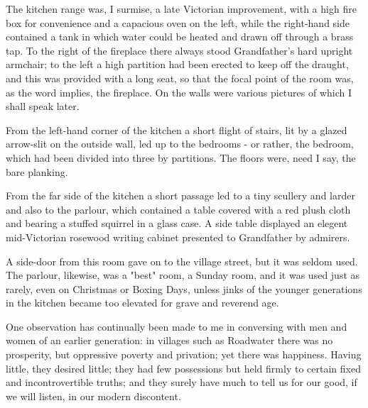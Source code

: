 The kitchen range was, I surmise, a late Victorian improvement, with a high fire box for convenience and a capacious oven on the left, while the right-hand side contained a tank in which water could be heated and drawn off through a brass tap. To the right of the fireplace there always stood Grandfather's hard upright armchair; to the left a high partition had been erected to keep off the draught, and this was provided with a long seat, so that the focal point of the room was, as the word implies, the fireplace. On the walls were various pictures of which I shall speak later.

From the left-hand corner of the kitchen a short flight of stairs, lit by a glazed arrow-slit on the outside wall, led up to the bedrooms - or rather, the bedroom, which had been divided into three by partitions. The floors were, need I say, the bare planking.

From the far side of the kitchen a short passage led to a tiny scullery and larder and also to the parlour, which contained a table covered with a red plush cloth and bearing a stuffed squirrel in a glass case. A side table displayed an elegent mid-Victorian rosewood writing cabinet presented to Grandfather by admirers.

A side-door from this room gave on to the village street, but it was seldom used. The parlour, likewise, was a "best" room, a Sunday room, and it was used just as rarely, even on Christmas or Boxing Days, unless jinks of the younger generations in the kitchen became too elevated for grave and reverend age.

\Flourish

One observation has continually been made to me in conversing with men and women of an earlier generation: in villages such as Roadwater there was no prosperity, but oppressive poverty and privation; yet there was happiness. Having little, they desired little; they had few possessions but held firmly to certain fixed and incontrovertible truths; and they surely have much to tell us for our good, if we will listen, in our modern discontent.
